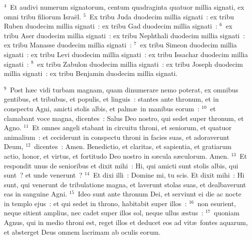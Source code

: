 ${}^{4}$~Et audivi numerum signatorum, centum quadraginta quatuor millia signati, ex omni tribu filiorum Isra\"el.
${}^{5}$~Ex tribu Juda duodecim millia signati~: ex tribu Ruben duodecim millia signati~: ex tribu Gad duodecim millia signati~:
${}^{6}$~ex tribu Aser duodecim millia signati~: ex tribu Nephthali duodecim millia signati~: ex tribu Manasse duodecim millia signati~:
${}^{7}$~ex tribu Simeon duodecim millia signati~: ex tribu Levi duodecim millia signati~: ex tribu Issachar duodecim millia signati~:
${}^{8}$~ex tribu Zabulon duodecim millia signati~: ex tribu Joseph duodecim millia signati~: ex tribu Benjamin duodecim millia signati.


${}^{9}$~Post h\ae c vidi turbam magnam, quam dinumerare nemo poterat, ex omnibus gentibus, et tribubus, et populis, et linguis~: stantes ante thronum, et in conspectu Agni, amicti stolis albis, et palm\ae\ in manibus eorum~:
${}^{10}$~et clamabant voce magna, dicentes~: Salus Deo nostro, qui sedet super thronum, et Agno.
${}^{11}$~Et omnes angeli stabant in circuitu throni, et seniorum, et quatuor animalium~: et ceciderunt in conspectu throni in facies suas, et adoraverunt Deum,
${}^{12}$~dicentes~: Amen. Benedictio, et claritas, et sapientia, et gratiarum actio, honor, et virtus, et fortitudo Deo nostro in s\ae cula s\ae culorum. Amen.
${}^{13}$~Et respondit unus de senioribus et dixit mihi~: Hi, qui amicti sunt stolis albis, qui sunt~? et unde venerunt~?
${}^{14}$~Et dixi illi~: Domine mi, tu scis. Et dixit mihi~: Hi sunt, qui venerunt de tribulatione magna, et laverunt stolas suas, et dealbaverunt eas in sanguine Agni.
${}^{15}$~Ideo sunt ante thronum Dei, et serviunt ei die ac nocte in templo ejus~: et qui sedet in throno, habitabit super illos~:
${}^{16}$~non esurient, neque sitient amplius, nec cadet super illos sol, neque ullus \ae stus~:
${}^{17}$~quoniam Agnus, qui in medio throni est, reget illos et deducet eos ad vit\ae\ fontes aquarum, et absterget Deus omnem lacrimam ab oculis eorum.

